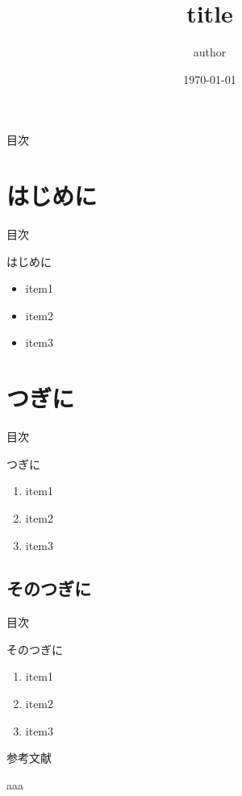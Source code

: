 \documentclass[aspectratio=169, dvipdfmx, 11pt, xcolor={usenames, dvipsnames}]{beamer} %
\title{title}
\date{\today}
\author{author}
\begin{document}
\maketitle

\begin{frame}{目次}
	\tableofcontents
\end{frame}

\section{はじめに}
\begin{frame}{目次}
	\tableofcontents[currentsection]
\end{frame}

\begin{frame}{はじめに}
	\begin{itemize}
		\item item1
		\item item2
		\item item3
	\end{itemize}
\end{frame}

\section{つぎに}
\begin{frame}{目次}
	\tableofcontents[currentsection]
\end{frame}

\begin{frame}{つぎに}
	\begin{enumerate}
		\item item1
		\item item2
		\item item3
	\end{enumerate}
\end{frame}

\subsection{そのつぎに}
\begin{frame}{目次}
\end{frame}

\begin{frame}{そのつぎに}
	\begin{enumerate}
		\item item1
		\item item2
		\item item3
	\end{enumerate}
\end{frame}

\begin{frame}{参考文献}
    \begin{thebibliography}{99}
        \beamertemplatetextbibitems
	 aaa
    \end{thebibliography}
\end{frame}
\end{document}

